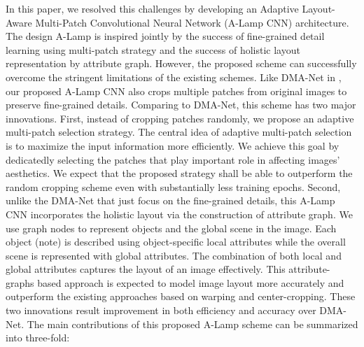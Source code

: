 \documentclass[10pt,twocolumn,letterpaper]{article}
\begin{document}
	In this paper, we resolved this challenges by developing an Adaptive Layout-Aware Multi-Patch Convolutional Neural Network (A-Lamp CNN) architecture. The design A-Lamp is inspired jointly by the success of fine-grained detail learning using multi-patch strategy \cite{Lu:2015:ICCV,Liu:2016:CVPR:multi_patch} and the success of holistic layout representation by attribute graph. However, the proposed scheme can successfully overcome the stringent limitations of the existing schemes.
	Like DMA-Net in \cite{Lu:2015:ICCV}, our proposed A-Lamp CNN also crops multiple patches from original images to preserve fine-grained details. Comparing to DMA-Net, this scheme has two major innovations. First, instead of cropping patches randomly, we propose an adaptive multi-patch selection strategy. The central idea of adaptive multi-patch selection is to maximize the input information more efficiently. We achieve this goal by dedicatedly selecting the patches that play important role in affecting images' aesthetics. We expect that the proposed strategy shall be able to outperform the random cropping scheme even with substantially less training epochs. Second, unlike the DMA-Net that just focus on the fine-grained details, this A-Lamp CNN incorporates the holistic layout via the construction of attribute graph. We use graph nodes to represent objects and the global scene in the image. Each object (note) is described using object-specific local attributes while the overall scene is represented with global attributes. The combination of both local and global attributes captures the layout of an image effectively. This attribute-graphs based approach is expected to model image layout more accurately and outperform the existing approaches based on warping and center-cropping. These two innovations result improvement in both efficiency and accuracy over DMA-Net. The main contributions of this proposed A-Lamp scheme can be summarized into three-fold:
	
	
\end{document}
